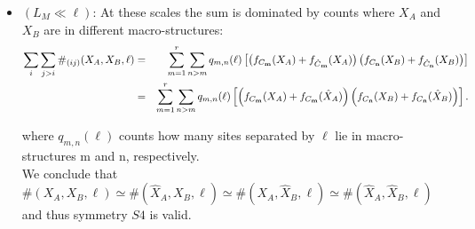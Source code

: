 \documentclass[fleqn,10pt]{wlscirep}
\def\sm{\textbf{\tiny m}}
\def\sn{\textbf{\tiny n}}
\begin{document}
\begin{itemize}
\begin{eqnarray}
\end{eqnarray}
where  
\\
\begin{eqnarray}
s(\ell)\simeq \frac14(L_M-\ell)  \quad \quad \quad L_S<\ell\ll L_M.\nonumber
\end{eqnarray} 
\\
We conclude that  $\#(X_A,X_B,\ell) \simeq \#(\hat{X}_B,\hat{X}_A,\ell)\simeq \#(X_B,X_A,\ell) \simeq \#(\hat{X}_A,\hat{X}_B,\ell)\simeq
\#(\hat{X}_A,X_B,\ell) \simeq \#(\hat{X}_B,{X}_A,\ell)\simeq \#(X_B,\hat{X}_A,\ell) \simeq \#({X}_A,\hat{X}_B,\ell)$ at these scales, 
and thus symmetry $S3$ (and $S2,S1$ and $S4$) is valid.


\item[-] \textbf{$(L_M \ll \ell) $}: At these scales the sum is dominated by counts where $X_A$ and $X_B$  are in different macro-structures:
\begin{eqnarray}
\sum_{i}\sum_{j>i}{\#_{(ij)}(X_A,X_B,\ell)}
      &= & \sum_{m=1}^r\sum_{n>m} q_{m,n}(\ell)\left[ \left( f_{C_\sm}(X_A)+  f_{{\hat{C}}_\sm}({X}_A) \right) \left(f_{C_\sn}(X_B)+ f_{\hat{C}_\sn}({X}_B) \right)\right] \nonumber\\
   &= & \sum_{m=1}^r\sum_{n>m} q_{m,n}(\ell) \left[ \left( f_{C_\sm}(X_A)+  f_{{C}_\sm}(\hat{X}_A) \right) \left(f_{C_\sn}(X_B)+ f_{{C}_\sn}(\hat{X}_B) \right)\right].\nonumber
\end{eqnarray}

where $q_{m,n}(\ell)$ counts how many sites separated by $\ell$ lie in macro-structures $\textrm{m}$ and  $\textrm{n}$, respectively. \\
We conclude that  $\#(X_A,X_B,\ell) \simeq \#(\hat{X}_A,X_B,\ell)\simeq \#(X_A,\hat{X}_B,\ell) \simeq \#(\hat{X}_A,\hat{X}_B,\ell)$ and thus symmetry $S4$ is valid.
\end{itemize}
\end{document}
